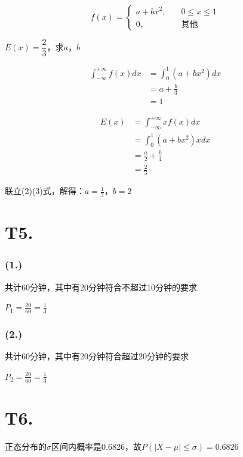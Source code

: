 \documentclass{article}
\newcommand\f[2]{\frac{#1}{#2}}
\newcommand\df[2]{\dfrac{#1}{#2}}
\begin{document}
\[
f(x)=
\begin{cases}
    a+bx^2, &\quad 0\leq x \leq1\\
    0, &\quad \text{其他}
\end{cases}
\]

$E(x)=\df{2}{3}$，求$a$，$b$

\begin{equation}
    \begin{aligned}
        \int_{-\infty}^{+\infty}f(x)dx
        & =\int_{0}^{1}(a+bx^2)dx\\
        & =a+\f{b}{3}\\
        & =1
    \end{aligned}
\end{equation}

\begin{equation}
    \begin{aligned}
        E(x)
        & =\int_{-\infty}^{+\infty}xf(x)dx\\
        & =\int_{0}^{1}(a+bx^2)xdx\\
        & =\f{a}{2}+\f{b}{4}\\
        & =\f{2}{3}
    \end{aligned}
\end{equation}

联立(2)(3)式，解得：$a=\f{1}{3}$，$b=2$

\section*{T5. }

\subsubsection*{(1.)}

共计60分钟，其中有20分钟符合不超过10分钟的要求

$P_1=\f{20}{60}=\f{1}{3}$

\subsubsection*{(2.)}

共计60分钟，其中有20分钟符合超过20分钟的要求

$P_2=\f{20}{60}=\f{1}{3}$

\section*{T6. }

正态分布的$\sigma$区间内概率是0.6826，故$P(|X-\mu|\leq\sigma)=0.6826$
\end{document}
